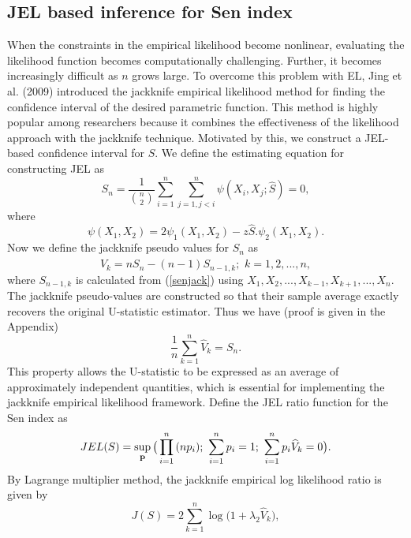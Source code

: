 \documentclass[11pt]{article}
\begin{document}
\subsection{JEL based inference for Sen index}
When the constraints in the empirical likelihood  become nonlinear, evaluating the likelihood function becomes computationally challenging. Further, it becomes increasingly difficult as $n$ grows large. To overcome this problem with EL, Jing et al. (2009) introduced the jackknife empirical likelihood method for finding the confidence interval of the desired parametric function. This method is highly popular among researchers because it combines the effectiveness of the likelihood approach with the jackknife technique. Motivated by this, we construct a JEL-based confidence interval for $S$.
We define the estimating equation for constructing JEL as
 \begin{equation}\label{senjack}
   S_{n}=\frac{1}{\binom{n}{2}}\sum_{i=1}^{n}\sum_{j=1,j<i}^{n}\psi(X_i,X_j;\widehat{S})=0,
 \end{equation}
 where
  \begin{equation*}
 \psi(X_1,X_2)=2\psi_{1}(X_1,X_2)-z\widehat{S}.\psi_{2}(X_1,X_2).
  \end{equation*}
  Now we define the jackknife pseudo values for $S_{n}$ as
  \begin{equation*}
    \widehat{V}_{k}=nS_{n}-(n-1)S_{n-1,k};\,\,k=1,2,...,n,
  \end{equation*}
  where $S_{n-1,k}$ is calculated from (\ref{senjack}) using $X_1,X_2,...,X_{k-1},X_{k+1},...,X_{n}$. The jackknife pseudo-values are constructed so that their sample average exactly recovers the original U-statistic estimator.
  Thus we have (proof is given in the Appendix)
  \begin{equation*}
    \frac{1}{n}\sum_{k=1}^{n}\widehat{V}_{k}=S_{n}.
  \end{equation*} This property allows the U-statistic to be expressed as an average of approximately independent quantities, which is essential for implementing the jackknife empirical likelihood framework.
  Define the JEL ratio  function for the Sen index as
  \begin{equation*}
 JEL(S)=\sup_{\bf p} \big(\prod_{i=1}^{n}{(np_i)};\,\, \sum_{i=1}^{n}{p_i}=1;\,\,\sum_{i=1}^{n}{p_i \widehat{V}_{k}}=0\big).
\end{equation*}
By Lagrange multiplier method, the jackknife empirical log likelihood ratio is given by
\begin{equation*}
  J(S)=2\sum_{k=1}^{n}\log\big(1+\lambda_{2}\widehat{V}_{k}\big),
\end{equation*}
\end{document}

